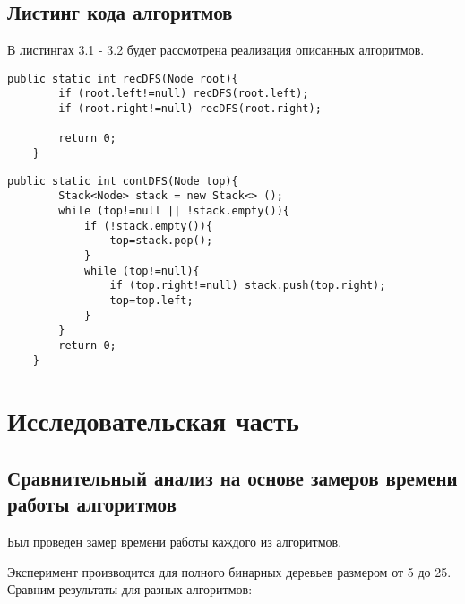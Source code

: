 \documentclass[12pt]{report}
\begin{document}
\section{Листинг кода алгоритмов}
В листингах 3.1 - 3.2 будет рассмотрена реализация описанных алгоритмов.

\begin{lstlisting}[label=CodeStand,caption= Рекурсивный алгоритм обхода дерева в глубину]
public static int recDFS(Node root){
        if (root.left!=null) recDFS(root.left);
        if (root.right!=null) recDFS(root.right);

        return 0;
    }
\end{lstlisting}


\begin{lstlisting}[label=some-code,caption=Итерационный алгоритм обхода дерева в глубину]
public static int contDFS(Node top){
        Stack<Node> stack = new Stack<> ();
        while (top!=null || !stack.empty()){
            if (!stack.empty()){
                top=stack.pop();
            }
            while (top!=null){
                if (top.right!=null) stack.push(top.right);
                top=top.left;
            }
        }
        return 0;
    }
\end{lstlisting}




\chapter{Исследовательская часть}

\section{Сравнительный анализ на основе замеров времени работы алгоритмов}

Был проведен замер времени работы каждого из алгоритмов.

Эксперимент производится для полного бинарных деревьев размером от 5 до 25. 
Сравним результаты для разных алгоритмов:

\end{document}
